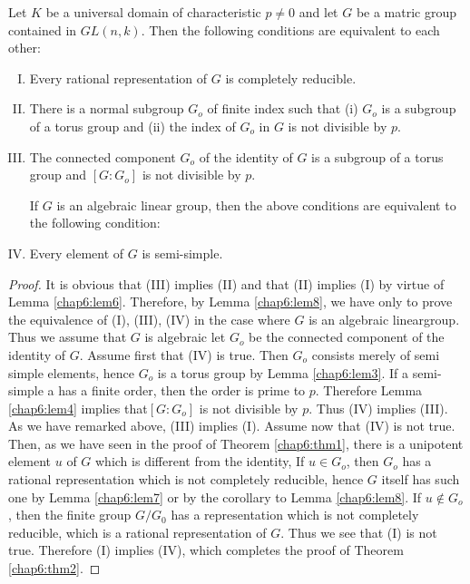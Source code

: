 \medskip
{}


\begin{thm}\label{chap6:thm2}%
  Let $K$ be a universal domain of characteristic $p \neq 0$ and let
  $G$ be a matric group contained in $GL(n ,k)$. Then the following
  conditions are equivalent to each other: 
  \begin{enumerate}[(I)]
  \item Every rational representation of $G$ is completely reducible.

  \item  There is a normal subgroup $G_o$ of finite index such that
    (i) $G_o$ is a subgroup of a torus group and (ii) the index of
    $G_o$ in  $G$ is not divisible by $p$. 

  \item The connected component $G_o$ of the identity of $G$ is a
    subgroup of a torus group and $[G: G_o]$ is not divisible by $p$. 
    
    If $G$ is an algebraic linear group, then the above conditions
    are equivalent to the following condition: 

  \item Every element of $G$ is semi-simple.
  \end{enumerate}
\end{thm}

\begin{proof}
  It is obvious that (III) implies (II) and that (II) implies
  (I) by virtue of Lemma \ref{chap6:lem6}. Therefore, by Lemma
  \ref{chap6:lem8}, we have only 
  to prove the equivalence of (I), (III), (IV) in the case  where $G$
  is an algebraic linear\pageoriginale group. Thus we assume that $G$
  is algebraic 
  let $G_o$ be the connected component of the identity of $G$. Assume
first  that (IV) is true. Then $G_o$ consists merely of semi simple elements,
hence $G_o$ is a torus group by Lemma \ref{chap6:lem3}. If a semi-simple a has
  a finite order, then the order is prime to $p$. Therefore Lemma
  \ref{chap6:lem4} 
  implies that$[G: G_o]$ is not divisible by $p$.  Thus (IV) implies
  (III). As we have remarked above, (III) implies (I). Assume
  now that (IV) is not true. Then, as we have seen in the proof of
  Theorem \ref{chap6:thm1}, there is a unipotent element $u$ of $G$ which is
  different from the  identity, If $u \in G_o$, then $G_o$ has a
  rational representation which is not completely reducible, hence $G$
  itself has such one by Lemma \ref{chap6:lem7} or by the corollary to Lemma
  \ref{chap6:lem8}. If $u \notin G_o$, then the finite group $G/G_0$ has a
  representation which is not completely reducible, which is a
  rational representation of $G$. Thus we see that (I) is not
  true. Therefore (I) implies (IV), which completes the proof of
  Theorem \ref{chap6:thm2}.   
\end{proof}

